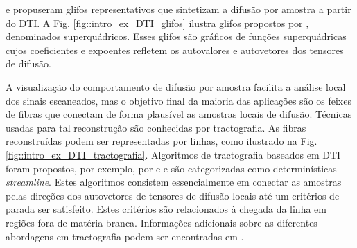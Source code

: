 \documentclass[
    12pt,                %
    oneside,            %
    a4paper,            %
    english,            %
    french,                %
    spanish,            %
    brazil                %
    ]{abntex2}
\begin{document}

 e  propuseram glifos representativos que sintetizam a difusão por amostra a partir do DTI. A Fig. \ref{fig::intro_ex_DTI_glifos} ilustra glifos propostos por , denominados superquádricos. Esses glifos são gráficos de funções superquádricas cujos coeficientes e expoentes refletem os autovalores e autovetores dos tensores de difusão.

A visualização do comportamento de difusão por amostra facilita a análise local dos sinais escaneados, mas o objetivo final da maioria das aplicações são os feixes de fibras que conectam de forma plausível as amostras locais de difusão. Técnicas usadas para tal reconstrução são conhecidas por tractografia. As fibras reconstruídas podem ser representadas por linhas, como ilustrado na Fig. \ref{fig::intro_ex_DTI_tractografia}. Algoritmos de tractografia baseados em DTI foram propostos, por exemplo, por  e  e são categorizadas como determinísticas \textit{streamline}. Estes algoritmos consistem essencialmente em conectar as amostras pelas direções dos autovetores de tensores de difusão locais até um critérios de parada ser satisfeito. Estes critérios são relacionados à chegada da linha em regiões fora de matéria branca. Informações adicionais sobre as diferentes abordagens em tractografia podem ser encontradas em \cite{tournier2011, DTI_Handbook}.
\end{document}
